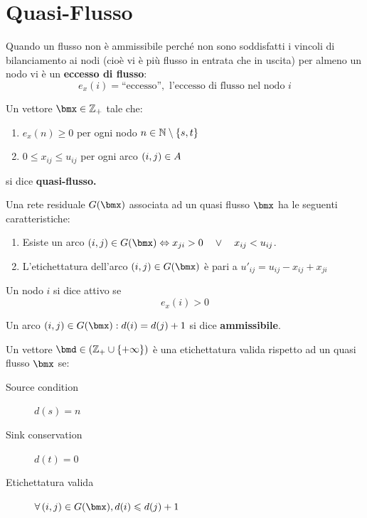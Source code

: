 \documentclass[\main/main.tex]{subfiles}
\begin{document}
\section{Quasi-Flusso}
\begin{definition}
  Quando un flusso non è ammissibile perché non sono soddisfatti i vincoli di bilanciamento ai nodi (cioè vi è più flusso in entrata che in uscita) per almeno un nodo vi è un \textbf{eccesso di flusso}:
  \[
    e_x(i)=\text{``eccesso''}, \text{ l'eccesso di flusso nel nodo \(i\)}
  \]
\end{definition}
\begin{definition}
  Un vettore \(\bmx \in \Z_+\) tale che:
  \begin{enumerate}
    \item \(e_x(n) \geq 0\) per ogni nodo \(n \in \mathbb{N} \setminus \left\{s,t\right\}\)
    \item \(0 \leq x_{ij} \leq u_{ij}\) per ogni arco \(\left(i,j\right) \in A\)
  \end{enumerate}
  si dice \textbf{quasi-flusso.}
\end{definition}
\clearpage
\begin{definition}
  Una rete residuale \(G(\bmx)\) associata ad un quasi flusso \(\bmx\) ha le seguenti caratteristiche:
  \begin{enumerate}
    \item Esiste un arco \(\rnd{i,j} \in G(\bmx) \Leftrightarrow x_{ji} > 0 \quad \lor \quad x_{ij} < u_{ij}\).
    \item L'etichettatura dell'arco \(\rnd{i,j} \in G(\bmx)\) è pari a \(u'_{ij} = u_{ij} - x_{ij} + x_{ji}\)
  \end{enumerate}
\end{definition}

\begin{definition}
  Un nodo \(i\) si dice attivo se \[e_x(i) > 0\]
\end{definition}
\begin{definition}
  Un arco \(\rnd{i,j} \in G(\bmx):  d(i) = d(j) +1\) si dice \textbf{ammissibile}.
\end{definition}
\begin{definition}
  Un vettore \(\bmd \in \rnd{\Z_+ \cup \crl{+\infty}}\) è una etichettatura valida rispetto ad un quasi flusso \(\bmx\) se:
  \begin{description}
    \item[Source condition] \(d(s) = n\)
    \item[Sink conservation] \(d(t) = 0\)
    \item[Etichettatura valida]\(\forall \rnd{i,j} \in G(\bmx), d(i) \leq d(j) +1\)
  \end{description}
\end{definition}
\end{document}
